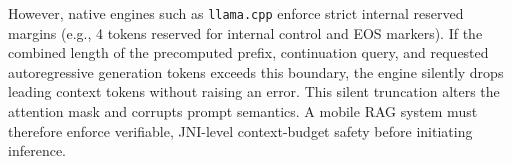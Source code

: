 However, native engines such as \texttt{llama.cpp} enforce strict internal reserved margins (e.g., 4 tokens reserved for internal control and EOS markers). If the combined length of the precomputed prefix, continuation query, and requested autoregressive generation tokens exceeds this boundary, the engine silently drops leading context tokens without raising an error. This silent truncation alters the attention mask and corrupts prompt semantics. A mobile RAG system must therefore enforce verifiable, JNI-level context-budget safety before initiating inference.
